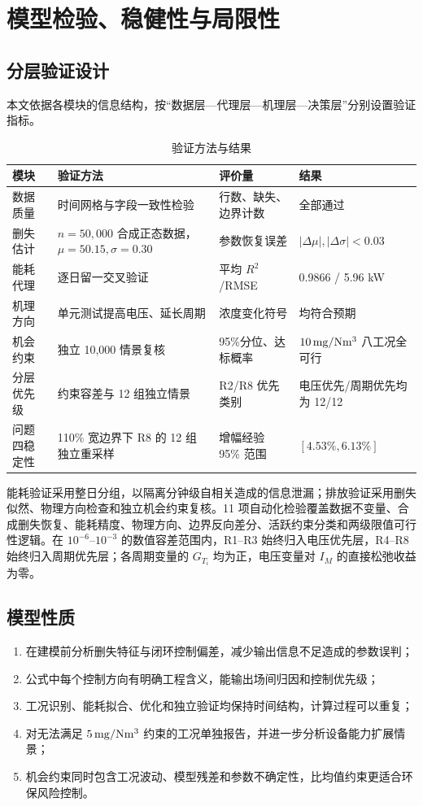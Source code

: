 \section{模型检验、稳健性与局限性}

\subsection{分层验证设计}

本文依据各模块的信息结构，按“数据层—代理层—机理层—决策层”分别设置验证指标。

\begin{table}[H]
\centering
\caption{验证方法与结果}
\label{tab:validation}
\small
\begin{tabularx}{0.97\textwidth}{C{2.3cm}L L C{2.4cm}}
\toprule
模块 & 验证方法 & 评价量 & 结果\\
\midrule
数据质量 & 时间网格与字段一致性检验 & 行数、缺失、边界计数 & 全部通过\\
删失估计 & $n=50,000$ 合成正态数据，$\mu=50.15,\sigma=0.30$ & 参数恢复误差 & $|\Delta\mu|,|\Delta\sigma|<0.03$\\
能耗代理 & 逐日留一交叉验证 & 平均 $R^2$/RMSE & 0.9866 / 5.96 kW\\
机理方向 & 单元测试提高电压、延长周期 & 浓度变化符号 & 均符合预期\\
机会约束 & 独立 10,000 情景复核 & 95\%分位、达标概率 & $10\,\mathrm{mg/Nm^3}$ 八工况全可行\\
分层优先级 & 约束容差与 12 组独立情景 & R2/R8 优先类别 & 电压优先/周期优先均为 12/12\\
问题四稳定性 & 110\% 宽边界下 R8 的 12 组独立重采样 & 增幅经验 95\% 范围 & $[4.53\%,6.13\%]$\\
\bottomrule
\end{tabularx}
\end{table}

能耗验证采用整日分组，以隔离分钟级自相关造成的信息泄漏；排放验证采用删失似然、物理方向检查和独立机会约束复核。11 项自动化检验覆盖数据不变量、合成删失恢复、能耗精度、物理方向、边界反向差分、活跃约束分类和两级限值可行性逻辑。在 $10^{-6}$--$10^{-3}$ 的数值容差范围内，R1--R3 始终归入电压优先层，R4--R8 始终归入周期优先层；各周期变量的 $G_{T_i}$ 均为正，电压变量对 $I_M$ 的直接松弛收益为零。

\subsection{模型性质}

\begin{enumerate}
  \item 在建模前分析删失特征与闭环控制偏差，减少输出信息不足造成的参数误判；
  \item 公式中每个控制方向有明确工程含义，能输出场间归因和控制优先级；
  \item 工况识别、能耗拟合、优化和独立验证均保持时间结构，计算过程可以重复；
  \item 对无法满足 $5\,\mathrm{mg/Nm^3}$ 约束的工况单独报告，并进一步分析设备能力扩展情景；
  \item 机会约束同时包含工况波动、模型残差和参数不确定性，比均值约束更适合环保风险控制。
\end{enumerate}

